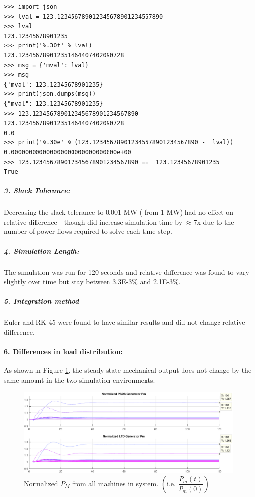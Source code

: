 \documentclass[12pt]{article}
\begin{document}
\begin{lstlisting}
>>> import json
>>> lval = 123.123456789012345678901234567890
>>> lval
123.12345678901235
>>> print('%.30f' % lval)
123.123456789012351464407402090728
>>> msg = {'mval': lval}
>>> msg
{'mval': 123.12345678901235}
>>> print(json.dumps(msg))
{"mval": 123.12345678901235}
>>> 123.123456789012345678901234567890-123.123456789012351464407402090728
0.0
>>> print('%.30e' % (123.123456789012345678901234567890 -  lval))
0.000000000000000000000000000000e+00
>>> 123.123456789012345678901234567890 ==  123.12345678901235
True
\end{lstlisting}

\subparagraph{3. Slack Tolerance:}
Decreasing the slack tolerance to 0.001 MW ( from 1 MW) had no effect on relative difference - though did increase simulation time by $\approx$7x due to the number of power flows required to solve each time step.

\subparagraph{4. Simulation Length:}
The simulation was run for 120 seconds and relative difference was found to vary slightly over time but stay between 3.3E-3\% and 2.1E-3\%.
\subparagraph{5. Integration method} Euler and RK-45 were found to have similar results and did not change relative difference.

\pagebreak
\paragraph{6. Differences in load distribution:} As shown in Figure \ref{pmnorm}, the steady state mechanical output does not change by the same amount in the two simulation environments. 
	\begin{figure}[h!]
			\centering
			\includegraphics[width=\linewidth]{nomalizedPM}\vspace{-1em}
			\caption{Normalized $P_M$ from all machines in system. $\left( \text{i.e. }\dfrac{P_m(t)}{P_m(0)} \right)$}
			\label{pmnorm}		 
	\end{figure}\vspace{-.5em}
\end{document}
